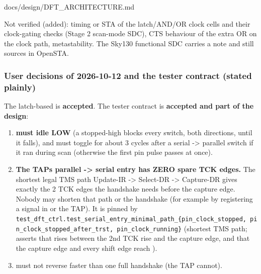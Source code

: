 \begin{relocated}{docs/design/DFT_ARCHITECTURE.md}
{}

Not verified (added): timing or STA of the
latch/\allowbreak{}AND/\allowbreak{}OR clock cells and their
clock-gating checks (Stage 2 scan-mode SDC), CTS behaviour of the extra
OR on the clock path, metastability. The Sky130 functional SDC carries a
note and still sources in OpenSTA.

\subsubsection{User decisions of 2026-10-12 and the tester
contract (stated plainly)}\label{tm:ch:dft-architecture:1591-user-decisions-of-2026-10-12-and-the-tester-contract-stated-plainly}

The latch-based  is \textbf{accepted}. The tester
contract is \textbf{accepted and part of the design}:

\begin{enumerate}
\def\labelenumi{\arabic{enumi}.}
\tightlist
\item
  \textbf{ must idle LOW} (a stopped-high
   blocks every switch, both directions, until it
  falls), and must toggle for about 3 cycles after a serial
  -\textgreater{} parallel switch if it ran during scan (otherwise the
  first pin pulse passes at once).
\item
  \textbf{The TAP\textquotesingle s parallel -\textgreater{} serial
  entry has ZERO spare TCK edges.} The shortest legal TMS path Update-IR
  -\textgreater{} Select-DR -\textgreater{} Capture-DR gives exactly the
  2 TCK edges the handshake needs before the capture edge. Nobody may
  shorten that path or the handshake (for example by registering a
  signal in  or the TAP). It is pinned by
  \texttt{test\_\allowbreak{}dft\_\allowbreak{}ctrl.\allowbreak{}test\_\allowbreak{}serial\_\allowbreak{}entry\_\allowbreak{}minimal\_\allowbreak{}path\_\allowbreak{}\{pin\_\allowbreak{}clock\_\allowbreak{}stopped,\allowbreak{}\ pin\_\allowbreak{}clock\_\allowbreak{}stopped\_\allowbreak{}after\_\allowbreak{}trst,\allowbreak{}\ pin\_\allowbreak{}clock\_\allowbreak{}running\}}
  (shortest TMS path; asserts that  rises between the 2nd
  TCK rise and the capture edge, and that the capture edge and every
  shift edge reach ).
\item
   must not reverse faster than one full handshake (the TAP
  cannot).
\end{enumerate}


\end{relocated}
